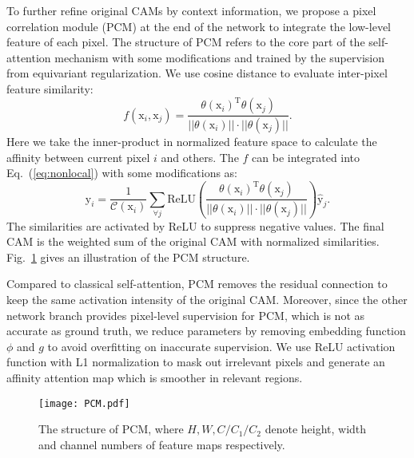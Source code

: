 \documentclass[10pt,twocolumn,letterpaper]{article}
\begin{document}
	To further refine original CAMs by context information, we propose a pixel correlation module (PCM) at the end of the network to integrate the low-level feature of each pixel. The structure of PCM refers to the core part of the self-attention mechanism with some modifications and trained by the supervision from equivariant regularization. We use cosine distance to evaluate inter-pixel feature similarity:
	\begin{equation}
	\label{eq:cos}
	f(\mathrm{x}_i, \mathrm{x}_j)=\frac{\theta(\mathrm{x}_i)^\mathrm{T}\theta(\mathrm{x}_j)}{||\theta(\mathrm{x}_i)||\cdot||\theta(\mathrm{x}_j)||}.
	\end{equation}
	Here we take the inner-product in normalized feature space to calculate the affinity between current pixel $i$ and others. The $f$ can be integrated into Eq.~(\ref{eq:nonlocal}) with some modifications as:
	\begin{equation}
	\label{eq:structure3}
	\mathrm{y}_i=\frac{1}{\mathcal{C}(\mathrm{x}_i)}\sum_{\forall j}\mathrm{ReLU}(\frac{\theta(\mathrm{x}_i)^\mathrm{T}\theta(\mathrm{x}_j)}{||\theta(\mathrm{x}_i)||\cdot ||\theta(\mathrm{x}_j)||})\mathrm{\hat{y}}_j.
	\end{equation}
	The similarities are activated by ReLU to suppress negative values. The final CAM is the weighted sum of the original CAM with normalized similarities. Fig.~\ref{fig:PCM} gives an illustration of the PCM structure.
	
	Compared to classical self-attention, PCM removes the residual connection to keep the same activation intensity of the original CAM. Moreover, since the other network branch provides pixel-level supervision for PCM, which is not as accurate as ground truth, we reduce parameters by removing embedding function $\phi$ and $g$ to avoid overfitting on inaccurate supervision. We use ReLU activation function with L1 normalization to mask out irrelevant pixels and generate an affinity attention map which is smoother in relevant regions. 
	\begin{figure}[t]
		\centering
		\texttt{[image: PCM.pdf]}
		\caption{The structure of PCM, where $H, W, C/C_1/C_2$ denote height, width and channel numbers of feature maps respectively.}
		\label{fig:PCM}
\end{figure}
	
\end{document}
